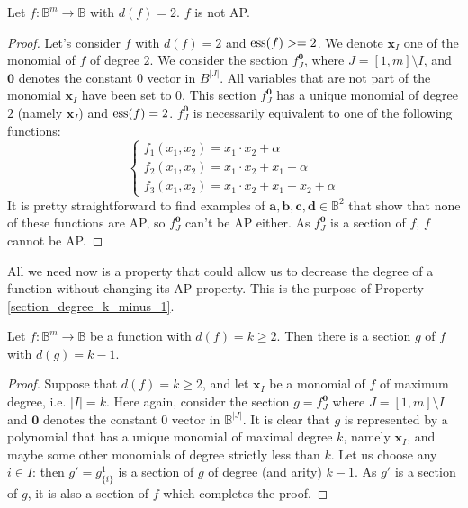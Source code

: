 \begin{property} \label{degree_2_not_AP}
 Let $f\colon \mathbb{B}^m\to \mathbb{B}$ with $d(f)=2$. $f$ is not AP.
\end{property}
\begin{proof}
  Let's consider $f$ with $d(f) = 2$ and $\operatorname{ess}(f) >= 2$. We denote $\mathbf{x}_I$ one of the
  monomial of $f$ of degree $2$. We consider the section $f^{\mathbf{0}}_J$,
  where $J = [1, m] \setminus I$,  and $\mathbf{0}$ denotes the constant 0
  vector in $B^{|J|}$. All variables that are not part of the monomial
  $\mathbf{x}_I$ have been set to $0$. This section $f^{\mathbf{0}}_J$ has a
  unique monomial of degree $2$ (namely $\mathbf{x}_I$) and $\operatorname{ess}(f) = 2$.
  $f^{\mathbf{0}}_J$ is necessarily equivalent to one of the following
  functions:
  $$
  \begin{cases}
    f_1(x_1, x_2) = x_1 \cdot x_2 + \alpha \\
    f_2(x_1, x_2) = x_1 \cdot x_2 + x_1 + \alpha\\
    f_3(x_1, x_2) = x_1 \cdot x_2 + x_1 + x_2 + \alpha
  \end{cases}$$
  It is pretty straightforward to find examples of $\mathbf{a}, \mathbf{b},
  \mathbf{c}, \mathbf{d} \in \mathbb{B}^2$
  that show that none of these functions are AP, so $f^{\mathbf{0}}_J$ can't
  be AP either. As $f^{\mathbf{0}}_J$ is a section of $f$, $f$ cannot be AP.
\end{proof}

All we need now is a property that could allow us to decrease the degree of a
function without changing its AP property. This is the purpose of
Property \ref{section_degree_k_minus_1}.

\begin{property}\label{section_degree_k_minus_1}
Let $f:\mathbb{B}^m\rightarrow \mathbb{B}$ be a function with
  $d(f)=k\geq 2$. Then there is a section $g$ of $f$ with $d(g)=k-1$.
\end{property}
\begin{proof}
Suppose that  $d(f)=k\geq 2$, and let $\mathbf{x}_I$ be a monomial of $f$ of
  maximum degree, i.e. $|I|=k$.  Here again, consider the section $g =
  f^{\mathbf{0}}_J$ where $J = [1, m] \setminus I$ and $\mathbf{0}$ denotes the
  constant $0$ vector in $\mathbb{B}^{|J|}$. It is clear that $g$ is
  represented by a  polynomial that has a unique monomial of maximal degree
  $k$, namely $\mathbf{x}_I$, and maybe some other monomials of degree strictly
  less than $k$.  Let us choose any $i \in I$: then $g' = g^1_{\{i\}}$ is a
  section of $g$ of degree (and arity) $k-1$. As $g'$ is a section of $g$, it
  is also a section of $f$ which completes the proof.
\end{proof}

